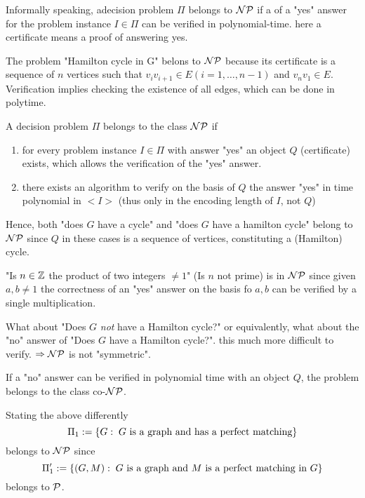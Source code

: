 Informally speaking, adecision problem $\Pi$ belongs to $\mathcal{NP}$ if a  of a "yes" answer for the problem instance $I \in \Pi$ can be verified in polynomial-time. here a certificate means a proof of answering yes.

\begin{xmp+}
The problem "Hamilton cycle in G" belons to $\mathcal{NP}$ because its certificate is a sequence of $n$ vertices such that $v_i v_{i+1} \in E (i=1, \dots, n-1)$ and $v_n v_1 \in E$. Verification implies checking the existence of all edges, which can be done in polytime.
\end{xmp+}

\begin{defn}
A decision problem $\Pi$ belongs to the class $\mathcal{NP}$ if
\begin{enumerate}
\item for every problem instance $I \in \Pi$ with answer "yes" an object $Q$ (certificate) exists, which allows the verification of the "yes" answer.
\item there exists an algorithm to verify on the basis of $Q$ the answer "yes" in time polynomial in $<I>$ (thus only in the encoding length of $I$, not $Q$)
\end{enumerate}

Hence, both "does $G$ have a cycle" and "does $G$ have a hamilton cycle" belong to $\mathcal{NP}$ since $Q$ in these cases is a sequence of vertices, constituting a (Hamilton) cycle.
\end{defn}

\begin{xmp+}
"Is $n \in \mathbb{Z}$ the product of two integers $\neq 1$" (Is $n$ not prime) is in $\mathcal{NP}$ since given $a,b \neq 1$ the correctness of an "yes" answer on the basis fo $a,b$ can be verified by a single multiplication.
\end{xmp+}

What about "Does $G$ \emph{not} have a Hamilton cycle?" or equivalently, what about the "no" answer of "Does $G$ have a Hamilton cycle?". this much more difficult to verify. $\Rightarrow \mathcal{NP}$ is not "symmetric".

If a "no" answer can be verified in polynomial time with an object $Q$, the problem belongs to the class co-$\mathcal{NP}$.

Stating the above differently 
\[
	\Pi_1:=\left\{ G: \; G \text{ is a graph and has a perfect matching}\right\}
\]
belongs to $\mathcal{NP}$ since
\[
	\Pi_1':=\left\{ (G,M): \; \text{$G$ is a graph and $M$ is a perfect matching in $G$}\right\}
\]
belongs to $\mathcal{P}$.

